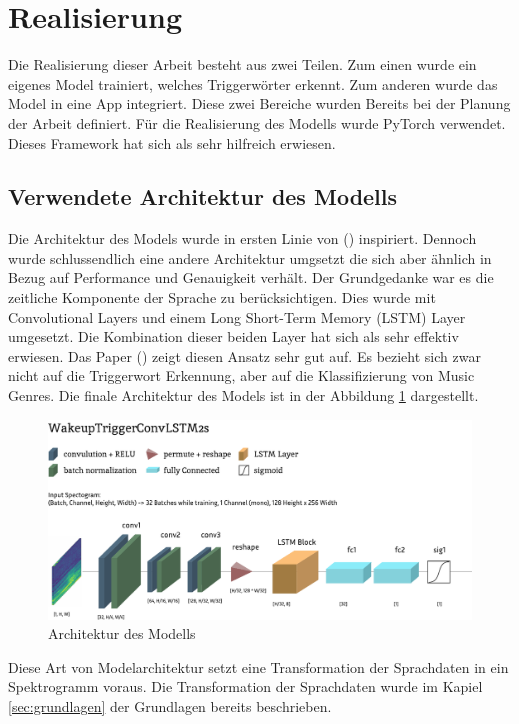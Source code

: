 \documentclass[11pt,a4paper]{article}
\begin{document}
\newpage \section{Realisierung}
Die Realisierung dieser Arbeit besteht aus zwei Teilen. Zum einen wurde ein eigenes Model
trainiert, welches Triggerwörter erkennt. Zum anderen wurde das Model in eine App integriert. 
Diese zwei Bereiche wurden Bereits bei der Planung der Arbeit definiert. Für die Realisierung
des Modells wurde PyTorch verwendet. Dieses Framework hat sich als sehr hilfreich erwiesen. 

\subsection{Verwendete Architektur des Modells}
Die Architektur des Models wurde in ersten Linie von (\cite{siri2017hey}) inspiriert. Dennoch 
wurde schlussendlich eine andere Architektur umgsetzt die sich aber ähnlich in Bezug auf Performance
und Genauigkeit verhält. Der Grundgedanke war es die zeitliche Komponente der Sprache zu
berücksichtigen. Dies wurde mit Convolutional Layers und einem Long Short-Term Memory (LSTM)
Layer umgesetzt. Die Kombination dieser beiden Layer hat sich als sehr effektiv erwiesen. Das Paper
(\cite{khamees2021classifying}) zeigt diesen Ansatz sehr gut auf. Es bezieht sich zwar nicht auf 
die Triggerwort Erkennung, aber auf die Klassifizierung von Music Genres. Die finale Architektur 
des Models ist in der Abbildung \ref{fig:model_architecture} dargestellt.

\begin{figure}[h]
	\centering
	\includegraphics[width=1.0\linewidth]{img/model_architecture.pdf}
	\caption{Architektur des Modells}
	\label{fig:model_architecture}
\end{figure}

\noindent \newline
Diese Art von Modelarchitektur setzt eine Transformation der Sprachdaten in ein Spektrogramm voraus.
Die Transformation der Sprachdaten wurde im Kapiel \ref{sec:grundlagen} der Grundlagen bereits
beschrieben.
\end{document}
